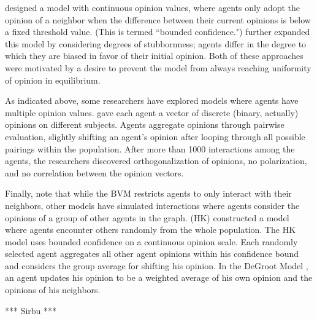 \cite{weisbuch_interacting_2001} designed a model with continuous opinion
values, where agents only adopt the opinion of a neighbor when the difference
between their current opinions is below a fixed threshold value. (This is
termed ``bounded confidence.") \cite{ghaderi_opinion_2012} further expanded
this model by considering degrees of stubbornness; agents differ in the degree
to which they are biased in favor of their initial opinion. Both of these
approaches were motivated by a desire to prevent the model from always
reaching uniformity of opinion in equilibrium.

As indicated above, some researchers
have explored models where agents have multiple opinion values.
\cite{deffuant_mixing_2000} gave each agent a vector of discrete (binary,
actually) opinions on different subjects. Agents aggregate opinions through pairwise
evaluation, 
slightly shifting an agent's opinion after looping through all possible
pairings within the population. After more than 1000 interactions among the
agents, the researchers discovered orthogonalization of opinions, no
polarization, and no correlation between the opinion vectors.


Finally, note that while the BVM restricts agents to only interact with their
neighbors, other models have simulated interactions where agents consider the
opinions of a group of other agents in the graph.
\cite{hegselmann_opinion_2002} (HK) constructed a model where agents encounter
others randomly from the whole population. The HK model uses bounded
confidence on a continuous opinion scale. Each randomly selected agent
aggregates all other agent opinions within his confidence bound and considers
the group average for shifting his opinion. In the DeGroot Model
\cite{degroot_reaching_1974}, an agent updates his opinion to be a weighted
average of his own opinion and the opinions of his neighbors.
 
*** Sirbu ***





